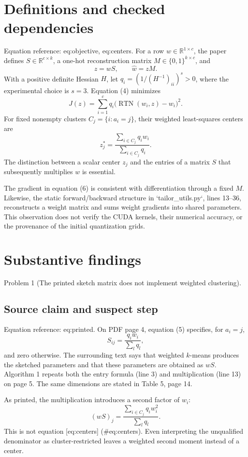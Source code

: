 \documentclass[10pt]{article}
\begin{document}
\section*{Definitions and checked dependencies}
Equation reference: eq:objective, eq:centers. For a row \(w\in\mathbb R^{1\times c}\), the paper defines \(S\in\mathbb R^{c\times k}\), a one-hot reconstruction matrix \(M\in\{0,1\}^{k\times c}\), and \[z=wS,\qquad \widehat w=zM.\] With a positive definite Hessian \(H\), let \(q_i=(1/(H^{-1})_{ii})^s>0\), where the experimental choice is \(s=3\). Equation (4) minimizes \[
 J(z)=\sum_{i=1}^c q_i\bigl(\operatorname{RTN}(w_i,z)-w_i\bigr)^2 .\] For fixed nonempty clusters \(C_j=\{i:a_i=j\}\), their weighted least-squares centers are \[
 z_j^*=\frac{\sum_{i\in C_j}q_iw_i}{\sum_{i\in C_j}q_i}.\] The distinction between a scalar center \(z_j\) and the entries of a matrix \(S\) that subsequently multiplies \(w\) is essential.\par
The gradient in equation (6) is consistent with differentiation through a fixed \(M\). Likewise, the static forward/backward structure in `tailor\_utils.py`, lines 13–36, reconstructs a weight matrix and sums weight gradients into shared parameters. This observation does not verify the CUDA kernels, their numerical accuracy, or the provenance of the initial quantization grids.\par
\section*{Substantive findings}
Problem 1 (The printed sketch matrix does not implement weighted clustering).\par
\subsection*{Source claim and suspect step}
Equation reference: eq:printed. On PDF page 4, equation (5) specifies, for \(a_i=j\), \[
 S_{ij}=\frac{q_iw_i}{\sum_lq_l},\] and zero otherwise. The surrounding text says that weighted \(k\)-means produces the sketched parameters and that these parameters are obtained as \(wS\). Algorithm 1 repeats both the entry formula (line 3) and multiplication (line 13) on page 5. The same dimensions are stated in Table 5, page 14.\par
As printed, the multiplication introduces a second factor of \(w_i\): \[(wS)_j=\frac{\sum_{i\in C_j}q_iw_i^2}{\sum_lq_l}.\] This is not equation [eq:centers] (\#eq:centers). Even interpreting the unqualified denominator as cluster-restricted leaves a weighted second moment instead of a center.\par
\end{document}
